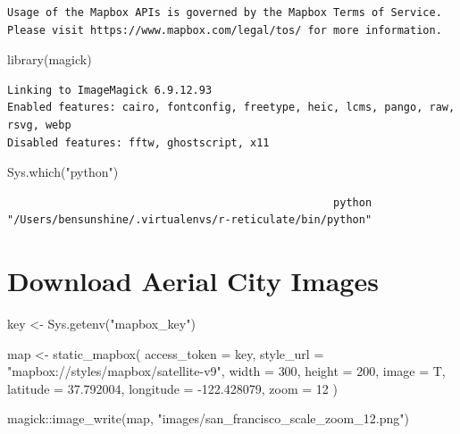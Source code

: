 \documentclass[
  letterpaper,
]{report}
\newenvironment{Shaded}{\begin{snugshade}}{\end{snugshade}}
\newcommand{\AttributeTok}[1]{\textcolor[rgb]{0.40,0.45,0.13}{#1}}
\newcommand{\DecValTok}[1]{\textcolor[rgb]{0.68,0.00,0.00}{#1}}
\newcommand{\FloatTok}[1]{\textcolor[rgb]{0.68,0.00,0.00}{#1}}
\newcommand{\FunctionTok}[1]{\textcolor[rgb]{0.28,0.35,0.67}{#1}}
\newcommand{\NormalTok}[1]{\textcolor[rgb]{0.00,0.23,0.31}{#1}}
\newcommand{\OtherTok}[1]{\textcolor[rgb]{0.00,0.23,0.31}{#1}}
\newcommand{\SpecialCharTok}[1]{\textcolor[rgb]{0.37,0.37,0.37}{#1}}
\newcommand{\StringTok}[1]{\textcolor[rgb]{0.13,0.47,0.30}{#1}}
\begin{document}
\begin{verbatim}
Usage of the Mapbox APIs is governed by the Mapbox Terms of Service.
Please visit https://www.mapbox.com/legal/tos/ for more information.
\end{verbatim}

\begin{Shaded}
\begin{Highlighting}[]
\FunctionTok{library}\NormalTok{(magick)}
\end{Highlighting}
\end{Shaded}

\begin{verbatim}
Linking to ImageMagick 6.9.12.93
Enabled features: cairo, fontconfig, freetype, heic, lcms, pango, raw, rsvg, webp
Disabled features: fftw, ghostscript, x11
\end{verbatim}

\begin{Shaded}
\begin{Highlighting}[]
\FunctionTok{Sys.which}\NormalTok{(}\StringTok{"python"}\NormalTok{)}
\end{Highlighting}
\end{Shaded}

\begin{verbatim}
                                                   python 
"/Users/bensunshine/.virtualenvs/r-reticulate/bin/python" 
\end{verbatim}

\hypertarget{download-aerial-city-images}{%
\section{Download Aerial City
Images}\label{download-aerial-city-images}}

\begin{Shaded}
\begin{Highlighting}[]
\NormalTok{key }\OtherTok{\textless{}{-}} \FunctionTok{Sys.getenv}\NormalTok{(}\StringTok{"mapbox\_key"}\NormalTok{)}
\end{Highlighting}
\end{Shaded}

\begin{Shaded}
\begin{Highlighting}[]
\NormalTok{map }\OtherTok{\textless{}{-}} \FunctionTok{static\_mapbox}\NormalTok{(}
  \AttributeTok{access\_token =}\NormalTok{ key,}
  \AttributeTok{style\_url =} \StringTok{"mapbox://styles/mapbox/satellite{-}v9"}\NormalTok{,}
  \AttributeTok{width =} \DecValTok{300}\NormalTok{,}
  \AttributeTok{height =} \DecValTok{200}\NormalTok{, }
  \AttributeTok{image =}\NormalTok{ T, }\AttributeTok{latitude =} \FloatTok{37.792004}\NormalTok{, }\AttributeTok{longitude =} \SpecialCharTok{{-}}\FloatTok{122.428079}\NormalTok{, }\AttributeTok{zoom =} \DecValTok{12}
\NormalTok{)}

\NormalTok{magick}\SpecialCharTok{::}\FunctionTok{image\_write}\NormalTok{(map, }\StringTok{"images/san\_francisco\_scale\_zoom\_12.png"}\NormalTok{)}
\end{Highlighting}
\end{Shaded}
\end{document}

